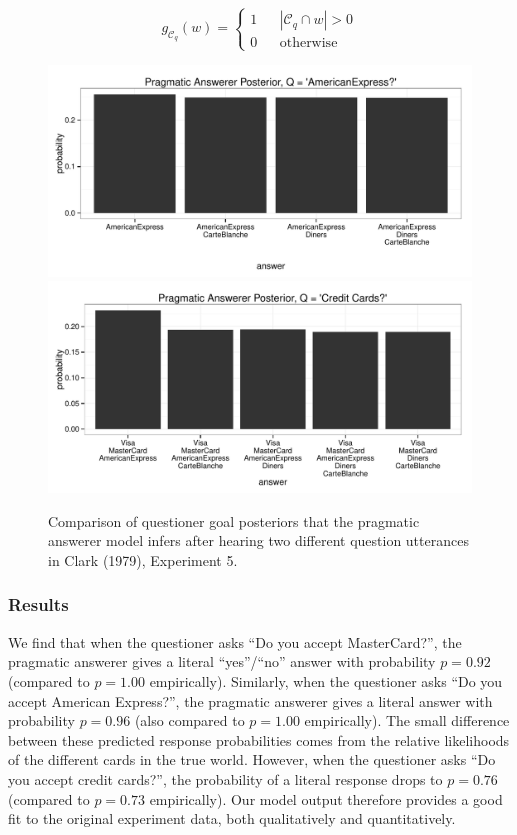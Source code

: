 \documentclass[12pt, floatsintext, jou]{apa6}
\begin{document}
$$g_{\mathcal{C}_q}(w) = \left\{\begin{array}{rcl} 1 && | \mathcal{C}_q \cap w | > 0 \\ 0 && \textrm{otherwise}\end{array}\right.$$
 \begin{figure}[t!]
\begin{center}
\includegraphics[scale = .6]{americanExpressPosterior.pdf}
\includegraphics[scale = .6]{creditCardsPosterior.pdf}
\end{center}
\vspace{-.25cm}
\caption{Comparison of questioner goal posteriors that the pragmatic answerer model infers after hearing two different question utterances in Clark (1979), Experiment 5. 
}
\label{fig:clarkExperiment5posteriors}
\end{figure}

\subsubsection{Results}

We find that when the questioner asks ``Do you accept MasterCard?'', the pragmatic answerer gives a literal ``yes''/``no'' answer with probability $p = 0.92$ (compared to $p=1.00$ empirically). Similarly, when the questioner asks ``Do you accept American Express?'', the pragmatic answerer gives a literal answer with probability $p = 0.96$ (also compared to $p=1.00$ empirically). The small difference between these predicted response probabilities comes from the relative likelihoods of the different cards in the true world. However, when the questioner asks ``Do you accept credit cards?'', the probability of a literal response drops to $p = 0.76$ (compared to $p=0.73$ empirically). Our model output therefore provides a good fit to the original experiment data, both qualitatively and quantitatively.
\end{document}
